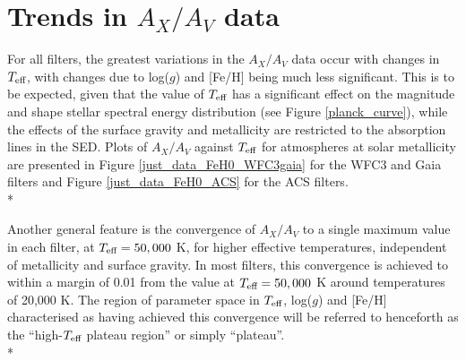 \documentclass[12pt, a4paper]{report}
\begin{document}
\section{Trends in $A_{X}/A_{V}$ data}
For all filters, the greatest variations in the $A_{X}/A_{V}$ data occur with changes in $T_{\textnormal{eff}}$, with changes due to log($g$) and [Fe/H] being much less significant. This is to be expected, given that the value of $T_{\textnormal{eff}}$ has a significant effect on the magnitude and shape stellar spectral energy distribution (see Figure \ref{planck_curve}), while the effects of the surface gravity and metallicity are restricted to the absorption lines in the SED. Plots of $A_{X}/A_{V}$ against $T_{\textnormal{eff}}$ for atmospheres at solar metallicity are presented in Figure \ref{just_data_FeH0_WFC3gaia} for the WFC3 and Gaia filters and Figure \ref{just_data_FeH0_ACS} for the ACS filters. \\*

Another general feature is the convergence of $A_{X}/A_{V}$ to a single maximum value in each filter, at $T_{\textnormal{eff}} = 50,000$ K, for higher effective temperatures, independent of metallicity and surface gravity. In most filters, this convergence is achieved to within a margin of 0.01 from the value at $T_{\textnormal{eff}} = 50,000$ K around temperatures of 20,000 K. The region of parameter space in $T_{\textnormal{eff}}$, log($g$) and [Fe/H] characterised as having achieved this convergence will be referred to henceforth as the ``high-$T_{\textnormal{eff}}$ plateau region'' or simply ``plateau''.\\*
\end{document}
